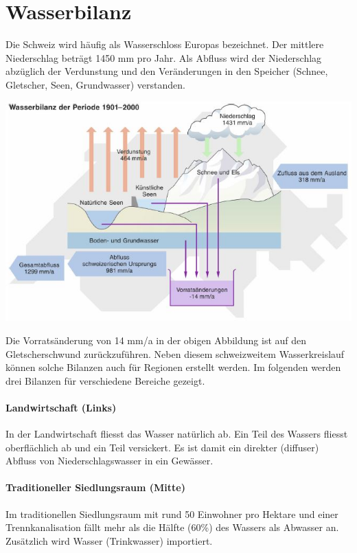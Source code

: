 \documentclass[9pt, openright=false]{scrartcl}
\begin{document}
\section{Wasserbilanz}
Die Schweiz wird häufig als Wasserschloss Europas bezeichnet. Der mittlere Niederschlag beträgt 1450 mm pro Jahr. Als Abfluss wird der Niederschlag abzüglich der Verdunstung und den Veränderungen in den Speicher (Schnee, Gletscher, Seen, Grundwasser) verstanden.
\begin{center}
\includegraphics[width=.7\textwidth]{images/wasserbilanz}
\end{center}
Die Vorratsänderung von 14 mm/a in der obigen Abbildung ist auf den Gletscherschwund zurückzuführen. Neben diesem schweizweitem Wasserkreislauf können solche Bilanzen auch für Regionen erstellt werden. Im folgenden werden drei Bilanzen für verschiedene Bereiche gezeigt.
\paragraph{Landwirtschaft (Links)} In der Landwirtschaft fliesst das Wasser natürlich ab. Ein Teil des Wassers fliesst oberflächlich ab und ein Teil versickert. Es ist damit ein direkter (diffuser) Abfluss von Niederschlagswasser in ein Gewässer.
\paragraph{Traditioneller Siedlungsraum (Mitte)} Im traditionellen Siedlungsraum mit rund 50 Einwohner pro Hektare und einer Trennkanalisation fällt mehr als die Hälfte (60\%) des Wassers als Abwasser an. Zusätzlich wird Wasser (Trinkwasser) importiert.
\end{document}
